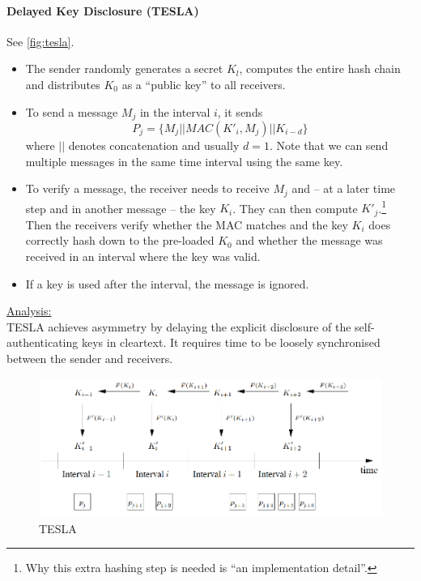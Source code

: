 \paragraph{Delayed Key Disclosure (TESLA)}
See \autoref{fig:tesla}.
\begin{itemize}
	\item The sender randomly generates a secret $K_l$, computes the entire hash chain and distributes $K_0$ as a ``public key'' to all receivers.
	\item To send a message $M_j$ in the interval $i$, it sends
	$$ P_j = \{ M_j || MAC(K'_i, M_j) || K_{i-d} \} $$
	where $||$ denotes concatenation and usually $d=1$.
	Note that we can send multiple messages in the same time interval using the same key.
	\item To verify a message, the receiver needs to receive $M_j$ and -- at a later time step and in another message -- the key $K_i$.
	They can then compute $K'_j$.\footnote{Why this extra hashing step is needed is ``an implementation detail''.}
	\\
	Then the receivers verify whether the MAC matches and the key $K_i$ does correctly hash down to the pre-loaded $K_0$ and whether the message was received in an interval where the key was valid.
	\item If a key is used after the interval, the message is ignored.
\end{itemize}

\underline{Analysis:}\\
TESLA achieves asymmetry by delaying the explicit disclosure of the self-authenticating keys in cleartext.
It requires time to be loosely synchronised between the sender and receivers.

\begin{figure}
	\centering
	\includegraphics[scale=0.6]{images/8-tesla.png}
	\caption{TESLA}
	\label{fig:tesla}
\end{figure}



